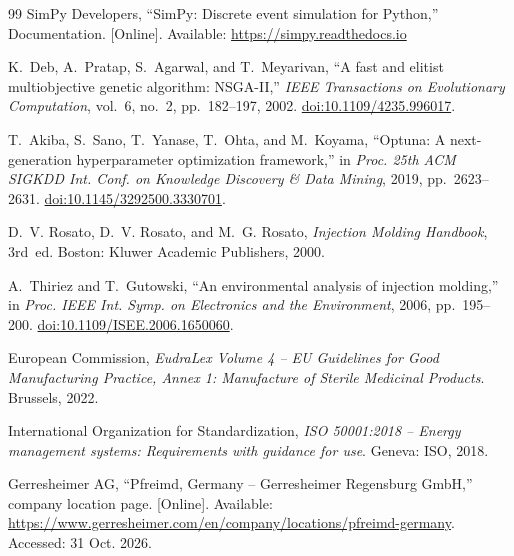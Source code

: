 \documentclass[11pt,a4paper]{article}
\begin{document}
\begin{thebibliography}{99}
 SimPy Developers, ``SimPy: Discrete event simulation for Python,'' Documentation. [Online]. Available: \url{https://simpy.readthedocs.io}

 K.~Deb, A.~Pratap, S.~Agarwal, and T.~Meyarivan, ``A fast and elitist multiobjective genetic algorithm: NSGA-II,'' \emph{IEEE Transactions on Evolutionary Computation}, vol.~6, no.~2, pp.~182--197, 2002. \href{https://doi.org/10.1109/4235.996017}{doi:10.1109/4235.996017}.

 T.~Akiba, S.~Sano, T.~Yanase, T.~Ohta, and M.~Koyama, ``Optuna: A next-generation hyperparameter optimization framework,'' in \emph{Proc. 25th ACM SIGKDD Int. Conf. on Knowledge Discovery \& Data Mining}, 2019, pp.~2623--2631. \href{https://doi.org/10.1145/3292500.3330701}{doi:10.1145/3292500.3330701}.

 D.~V. Rosato, D.~V. Rosato, and M.~G. Rosato, \emph{Injection Molding Handbook}, 3rd~ed. Boston: Kluwer Academic Publishers, 2000.

 A.~Thiriez and T.~Gutowski, ``An environmental analysis of injection molding,'' in \emph{Proc. IEEE Int. Symp. on Electronics and the Environment}, 2006, pp.~195--200. \href{https://doi.org/10.1109/ISEE.2006.1650060}{doi:10.1109/ISEE.2006.1650060}.

 European Commission, \emph{EudraLex Volume 4 -- EU Guidelines for Good Manufacturing Practice, Annex 1: Manufacture of Sterile Medicinal Products}. Brussels, 2022.

 International Organization for Standardization, \emph{ISO 50001:2018 -- Energy management systems: Requirements with guidance for use}. Geneva: ISO, 2018.

 Gerresheimer AG, ``Pfreimd, Germany -- Gerresheimer Regensburg GmbH,'' company location page. [Online]. Available: \url{https://www.gerresheimer.com/en/company/locations/pfreimd-germany}. Accessed: 31 Oct. 2026.

\end{thebibliography}
\end{document}
